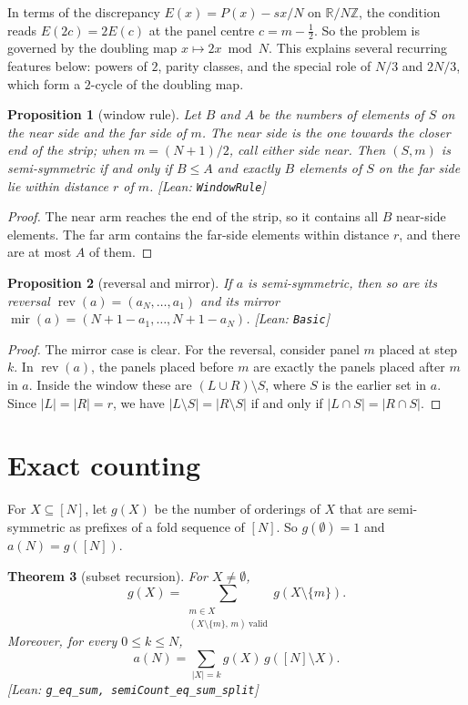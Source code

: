 \documentclass[11pt]{article}
\newtheorem{theorem}{Theorem}
\newtheorem{proposition}[theorem]{Proposition}
\theoremstyle{definition}
\theoremstyle{remark}
\newcommand{\lean}[1]{\textsf{\small[Lean: \texttt{#1}]}}
\DeclareMathOperator{\rev}{rev}
\DeclareMathOperator{\mir}{mir}
\begin{document}
In terms of the discrepancy $E(x)=P(x)-sx/N$ on $\mathbb R/N\mathbb Z$, the
condition reads $E(2c)=2E(c)$ at the panel centre $c=m-\tfrac12$. So the problem is
governed by the doubling map $x\mapsto 2x \bmod N$. This explains several recurring
features below: powers of $2$, parity classes, and the special role of $N/3$ and
$2N/3$, which form a $2$-cycle of the doubling map.

\begin{proposition}[window rule]
Let $B$ and $A$ be the numbers of elements of $S$ on the near side and the far side of
$m$. The \emph{near side} is the one towards the closer end of the strip; when
$m=(N+1)/2$, call either side near. Then $(S,m)$ is semi-symmetric if and only if
$B\le A$ and exactly $B$ elements of $S$ on the far side lie within distance $r$ of $m$.
\lean{WindowRule}
\end{proposition}

\begin{proof}
The near arm reaches the end of the strip, so it contains all $B$ near-side elements.
The far arm contains the far-side elements within distance $r$, and there are at most
$A$ of them.
\end{proof}

\begin{proposition}[reversal and mirror]\label{prop:sym}
If $a$ is semi-symmetric, then so are its reversal $\rev(a)=(a_N,\dots,a_1)$ and its
mirror $\mir(a)=(N+1-a_1,\dots,N+1-a_N)$. \lean{Basic}
\end{proposition}

\begin{proof}
The mirror case is clear. For the reversal, consider panel $m$ placed at step $k$.
In $\rev(a)$, the panels placed before $m$ are exactly the panels placed after $m$ in
$a$. Inside the window these are $(L\cup R)\setminus S$, where $S$ is the earlier set
in $a$. Since $|L|=|R|=r$, we have $|L\setminus S|=|R\setminus S|$ if and only if
$|L\cap S|=|R\cap S|$.
\end{proof}

\section{Exact counting}

For $X\subseteq[N]$, let $g(X)$ be the number of orderings of $X$ that are
semi-symmetric as prefixes of a fold sequence of $[N]$. So $g(\emptyset)=1$ and
$a(N)=g([N])$.

\begin{theorem}[subset recursion]\label{thm:rec}
For $X\ne\emptyset$,
\[
  g(X)=\sum_{\substack{m\in X\\ (X\setminus\{m\},\,m)\ \text{valid}}} g(X\setminus\{m\}).
\]
Moreover, for every $0\le k\le N$,
\[
  a(N)=\sum_{|X|=k} g(X)\,g([N]\setminus X).
\]
\lean{g\_eq\_sum, semiCount\_eq\_sum\_split}
\end{theorem}
\end{document}
